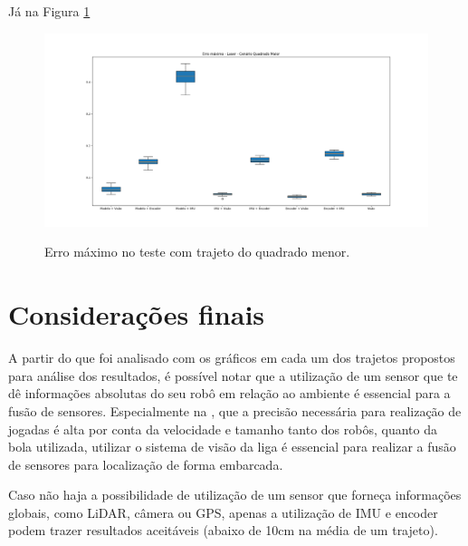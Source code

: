 \documentclass[acronym, symbols, table]{fei}
\begin{document}
		Já na Figura \ref{fig:erro_maximo_distancia_quad_maior}
		
		\begin{figure}[!htb]
			\centering
			\caption{Erro máximo no teste com trajeto do quadrado menor.}
			\includegraphics[width=1.0\textwidth]{../Dados/Graficos-Resultados/erro_maximo_distancia_quadrado_maior.png}
			\label{fig:erro_maximo_distancia_quad_maior}
		\end{figure}


	\section{Considerações finais}
	
		A partir do que foi analisado com os gráficos em cada um dos trajetos propostos para análise dos resultados, é possível notar que a utilização de um sensor que te dê informações absolutas do seu robô em relação ao ambiente é essencial para a fusão de sensores. Especialmente na , que a precisão necessária para realização de jogadas é alta por conta da velocidade e tamanho tanto dos robôs, quanto da bola utilizada, utilizar o sistema de visão da liga é essencial para realizar a fusão de sensores para localização de forma embarcada.
		
		Caso não haja a possibilidade de utilização de um sensor que forneça informações globais, como LiDAR, câmera ou GPS, apenas a utilização de IMU e encoder podem trazer resultados aceitáveis (abaixo de 10cm na média de um trajeto).
	
\end{document}
